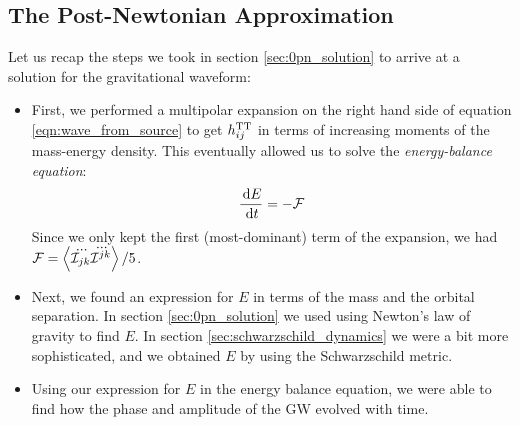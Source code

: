 \subsection{The Post-Newtonian Approximation}
\label{sec:post_newtonian}

Let us recap the steps we took in section \ref{sec:0pn_solution} to arrive at a solution for the gravitational waveform:
\begin{itemize}
\item{First, we performed a multipolar expansion on the right hand side of equation \ref{eqn:wave_from_source} to get $h^{\mathrm{TT}}_{ij}$ in terms of increasing moments of the mass-energy density. This eventually allowed us to solve the \emph{energy-balance equation}:
\begin{equation}
\label{eqn:energy_balance}
\frac{\d E}{\d t} = -\mathcal{F}
\end{equation}
Since we only kept the first (most-dominant) term of the expansion, we had $\mathcal{F} = \left<\dddot{\mathcal{I}_{jk}}\dddot{\mathcal{I}^{jk}}\right>/5$.}
\item{Next, we found an expression for $E$ in terms of the mass and the orbital separation. In section \ref{sec:0pn_solution} we used using Newton's law of gravity to find $E$. In section \ref{sec:schwarzschild_dynamics} we were a bit more sophisticated, and we obtained $E$ by using the Schwarzschild metric.}
\item{Using our expression for $E$ in the energy balance equation, we were able to find how the phase and amplitude of the \ac{GW} evolved with time.}
\end{itemize}

